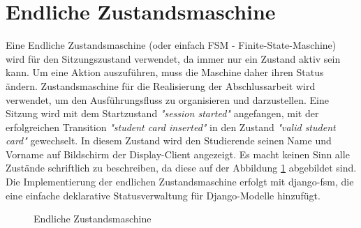\section{Endliche Zustandsmaschine}
\label{sec:design:fsm}
Eine Endliche Zustandsmaschine (oder einfach FSM - Finite-State-Maschine) wird für den Sitzungszustand verwendet, da immer nur ein Zustand aktiv sein kann. Um eine Aktion auszuführen, muss die Maschine daher ihren Status ändern. Zustandsmaschine für die Realisierung der Abschlussarbeit wird verwendet, um den Ausführungsfluss zu organisieren und darzustellen. Eine Sitzung wird mit dem Startzustand  \textit{"session started"} angefangen, mit der erfolgreichen Transition \textit{"student card inserted"} in den Zustand \textit{"valid student card"} gewechselt. In diesem Zustand wird den Studierende seinen Name und Vorname auf Bildschirm der Display-Client angezeigt. Es macht keinen Sinn alle Zustände schriftlich zu beschreiben, da diese auf der Abbildung \ref{fig:fsm} abgebildet sind. Die Implementierung der endlichen Zustandsmaschine erfolgt mit django-fsm, die eine einfache deklarative Statusverwaltung für Django-Modelle hinzufügt.

\begin{figure}
	\centering
	\caption{Endliche Zustandsmaschine}
	\label{fig:fsm}
\end{figure}